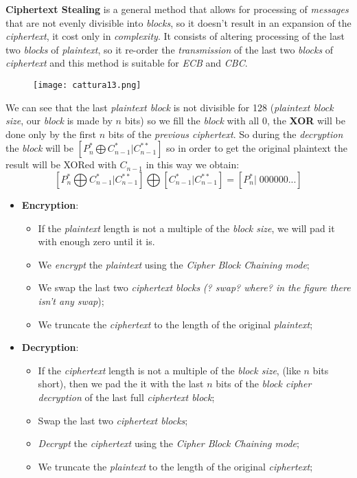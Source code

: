 \documentclass{article}
\begin{document}
\textbf{Ciphertext Stealing} is a general method that allows for processing of \emph{messages} that are not evenly divisible into \emph{blocks}, so it doesn't result in an expansion of the \emph{ciphertext}, it cost only in \emph{complexity}. It consists of altering processing of the last two \emph{blocks} of \emph{plaintext}, so it re-order the \emph{transmission} of the last two \emph{blocks} of \emph{ciphertext} and this method is suitable for \emph{ECB} and \emph{CBC}. 
\begin{figure}[H]
  \centering
  \texttt{[image: cattura13.png]}
\end{figure}
We can see that the last \emph{plaintext block} is not divisible for 128 (\emph{plaintext block size}, our \emph{block} is made by $n$ bits) so we fill the \emph{block} with all $0$, the \textbf{XOR} will be done only by the first $n$ bits of the \emph{previous ciphertext}. So during the \emph{decryption} the \emph{block} will be $\left [P_n^{*} \bigoplus C_{n-1}^* | C_{n-1}^{**} \right]$ so in order to get the original plaintext the result will be XORed with $C_{n-1}$ in this way we obtain: \[\left [P_n^{*} \bigoplus C_{n-1}^* | C_{n-1}^{**} \right] \bigoplus \left [  C_{n-1}^* | C_{n-1}^{**} \right ] = \left [ P_n^{*} |\; 000000... \right ]\]
\begin{itemize}
\item \textbf{Encryption}: 
\begin{itemize}
\item If the \emph{plaintext} length is not a multiple of the \emph{block size}, we will pad it with enough zero until it is.
\item We \emph{encrypt} the \emph{plaintext} using the \emph{Cipher Block Chaining mode};
\item We swap the last two \emph{ciphertext blocks} \emph{(? swap? where? in the figure there isn't any swap});
\item We truncate the \emph{ciphertext} to the length of the original \emph{plaintext}; 
\end{itemize}
\item \textbf{Decryption}:
\begin{itemize}
\item If the \emph{ciphertext} length is not a multiple of the \emph{block size}, (like $n$ bits short), then we pad the it with the last $n$ bits of the \emph{block cipher decryption }of the last full \emph{ciphertext block};
\item Swap the last two \emph{ciphertext blocks};
\item \emph{Decrypt} the \emph{ciphertext} using the \emph{Cipher Block Chaining mode};
\item We truncate the \emph{plaintext} to the length of the original \emph{ciphertext};
\end{itemize}
\end{itemize}
\end{document}
